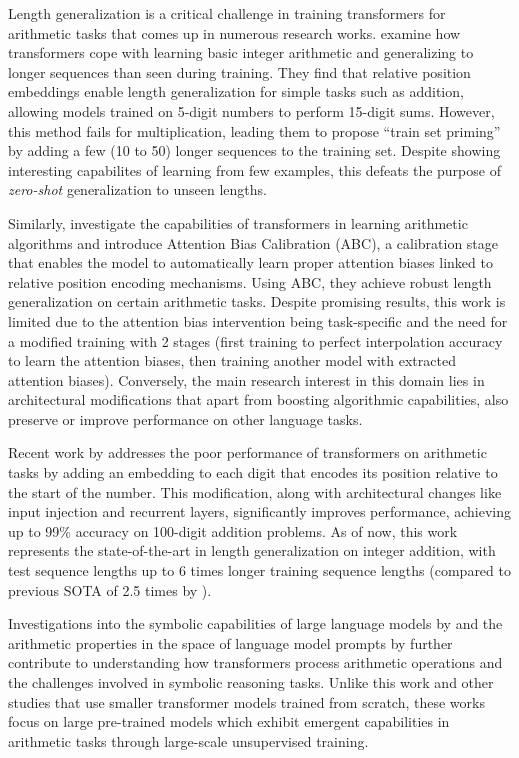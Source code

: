 Length generalization is a critical challenge in training transformers for arithmetic tasks that comes up in numerous research works. \cite{jelassi_length_2023} examine how transformers cope with learning basic integer arithmetic and generalizing to longer sequences than seen during training. They find that relative position embeddings enable length generalization for simple tasks such as addition, allowing models trained on 5-digit numbers to perform 15-digit sums. However, this method fails for multiplication, leading them to propose ``train set priming'' by adding a few (10 to 50) longer sequences to the training set. Despite showing interesting capabilites of learning from few examples, this defeats the purpose of \emph{zero-shot} generalization to unseen lengths.

Similarly, \cite{duan_interpolation_2023} investigate the capabilities of transformers in learning arithmetic algorithms and introduce Attention Bias Calibration (ABC), a calibration stage that enables the model to automatically learn proper attention biases linked to relative position encoding mechanisms. Using ABC, they achieve robust length generalization on certain arithmetic tasks. Despite promising results, this work is limited due to the attention bias intervention being task-specific and the need for a modified training with 2 stages (first training to perfect interpolation accuracy to learn the attention biases, then training another model with extracted attention biases). Conversely, the main research interest  in this domain lies in architectural modifications that apart from boosting algorithmic capabilities, also preserve or improve performance on other language tasks.

Recent work by \cite{mcleish_transformers_2024} addresses the poor performance of transformers on arithmetic tasks by adding an embedding to each digit that encodes its position relative to the start of the number. This modification, along with architectural changes like input injection and recurrent layers, significantly improves performance, achieving up to 99\% accuracy on 100-digit addition problems. As of now, this work represents the state-of-the-art in length generalization on integer addition, with test sequence lengths up to 6 times longer training sequence lengths (compared to previous SOTA of 2.5 times by \cite{zhou_transformers_2024}).

Investigations into the symbolic capabilities of large language models by \cite{dave_investigating_2024} and the arithmetic properties in the space of language model prompts by \cite{krubinski_basic_2023} further contribute to understanding how transformers process arithmetic operations and the challenges involved in symbolic reasoning tasks. Unlike this work and other studies that use smaller transformer models trained from scratch, these works focus on large pre-trained models which exhibit emergent capabilities in arithmetic tasks through large-scale unsupervised training.

